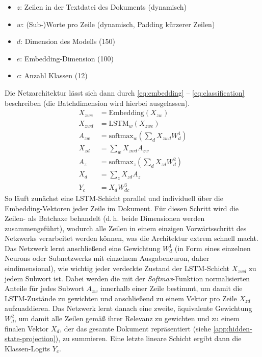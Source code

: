 \documentclass[bachelor,german]{info1thesis}
\begin{document}
%
\begin{itemize}
\itemsep-.5em
\item $z$: Zeilen in der Textdatei des Dokuments (dynamisch)
\item $w$: (Sub-)Worte pro Zeile (dynamisch, Padding kürzerer Zeilen)
\item $d$: Dimension des Modells (150)
\item $e$: Embedding-Dimension (100)
\item $c$: Anzahl Klassen (12)
\end{itemize}
%
Die Netzarchitektur lässt sich dann durch \autoref{eq:embedding} -- \ref{eq:classification} beschreiben (die Batchdimension wird hierbei ausgelassen).
%
\begin{align}
X_{zwe} &= \text{Embedding}(X_{zw}) \label{eq:embedding} \\
X_{zwd} &= \text{LSTM}_w(X_{zwe}) \label{eq:lstm} \\
A_{zw} &= \text{softmax}_w\left(\sum_d X_{zwd} W_{d}^1\right) \\
X_{zd} &= \sum_w X_{zwd} A_{zw} \label{eq:zd} \\
A_{z} &= \text{softmax}_z\left(\sum_d X_{zd} W_{d}^2\right) \label{eq:az} \\
X_{d} &= \sum_z X_{zd} A_z \label{eq:d} \\
Y_c &= X_d W_{dc}^3 \label{eq:classification}
\end{align}
%
So läuft zunächst eine LSTM-Schicht parallel und individuell über die Embedding-Vektoren jeder Zeile im Dokument. Für diesen Schritt wird die Zeilen- als Batchaxe behandelt (d.\,h. beide Dimensionen werden zusammengeführt), wodurch alle Zeilen in einem einzigen Vorwärtsschritt des Netzwerks verarbeitet werden können, was die Architektur extrem schnell macht. Das Netzwerk lernt anschließend eine Gewichtung $W_d^1$ (in Form eines einzelnen Neurons oder Subnetzwerks mit einzelnem Ausgabeneuron, daher eindimensional), wie wichtig jeder verdeckte Zustand der LSTM-Schicht $X_{zwd}$ zu jedem Subwort ist. Dabei werden die mit der \textit{Softmax}-Funktion normalisierten Anteile für jedes Subwort $A_{zw}$ innerhalb einer Zeile bestimmt, um damit die LSTM-Zustände zu gewichten und anschließend zu einem Vektor pro Zeile $X_{zd}$ aufzuaddieren. Das Netzwerk lernt danach eine zweite, äquivalente Gewichtung $W_d^2$, um damit alle Zeilen gemäß ihrer Relevanz zu gewichten und zu einem finalen Vektor $X_d$, der das gesamte Dokument repräsentiert (siehe \autoref{app:hidden-state-projection}), zu summieren. Eine letzte lineare Schicht ergibt dann die Klassen-Logits $Y_c$.
\end{document}
